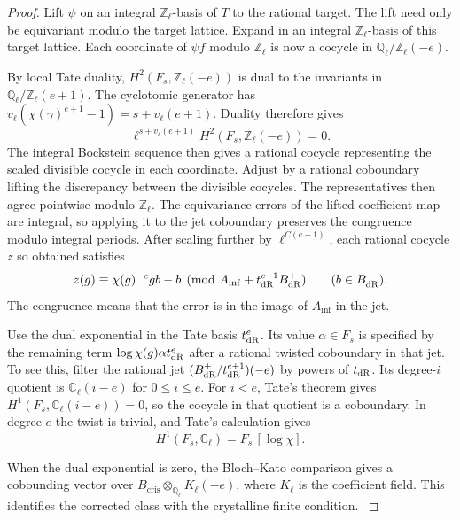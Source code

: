 \begin{proof}
Lift \(\psi\) on an integral
\(\mathbb Z_\ell\)-basis of \(T\) to the rational
target. The lift need only be equivariant modulo the
target lattice. Expand in an integral
\(\mathbb Z_\ell\)-basis of this target lattice.
Each coordinate of \(\psi f\) modulo \(\mathbb Z_\ell\)
is now a cocycle in
\(\mathbb Q_\ell/\mathbb Z_\ell(-e)\).

By local Tate duality,
\(H^2(F_s,\mathbb Z_\ell(-e))\) is dual to the
invariants in \(\mathbb Q_\ell/\mathbb Z_\ell(e+1)\).
The cyclotomic generator has \(v_\ell(\chi(\gamma)^{e+1}-1)=s+v_\ell(e+1)\). Duality therefore gives
\[
 \ell^{s+v_\ell(e+1)}H^2(F_s,\mathbb Z_\ell(-e))=0.
\]
The integral Bockstein sequence
then gives a rational cocycle representing the scaled
divisible cocycle in each coordinate. Adjust by a
rational coboundary lifting the discrepancy between
the divisible cocycles. The representatives then
agree pointwise modulo
\(\mathbb Z_\ell\).
The equivariance errors of the lifted coefficient
map are integral, so applying it to the jet
coboundary preserves the congruence modulo integral
periods. After scaling further by \(\ell^{C(e+1)}\),
each rational cocycle \(z\) so obtained satisfies
\[
 z(g)\equiv \chi(g)^{-e}g b-b
       \pmod {A_{\inf}+t_{\rm dR}^{e+1}B_{\rm dR}^+}
 \qquad (b\in B_{\rm dR}^+).
\]
The congruence means that the error is in the
image of \(A_{\inf}\) in the jet.

Use the dual exponential in the Tate basis \(t_{\rm dR}^e\). Its value \(\alpha\in F_s\) is
specified by the remaining term
\(\log\chi(g)\alpha t_{\rm dR}^e\) after a rational
twisted coboundary in that jet. To see this, filter the rational jet
\((B_{\rm dR}^+/t_{\rm dR}^{e+1})(-e)\) by powers of \(t_{\rm dR}\).
Its degree-\(i\) quotient is \(\mathbb C_\ell(i-e)\) for \(0\le i\le e\).
For \(i<e\), Tate's theorem gives
\(H^1(F_s,\mathbb C_\ell(i-e))=0\), so the cocycle in that quotient is
a coboundary. In degree \(e\) the twist is trivial, and Tate's calculation gives
\[
 H^1(F_s,\mathbb C_\ell)=F_s\,[\log\chi].
\]

When the dual exponential is zero, the Bloch--Kato
comparison gives a cobounding vector over
\(B_{\mathrm{cris}}\otimes_{\mathbb Q_\ell}K_\ell(-e)\),
where \(K_\ell\) is the coefficient field. This identifies
the corrected class with the crystalline finite condition.
\cite{tate-pdivisible,bloch-kato}\label{cor:cyclotomic-character-lifting-2}


\end{proof}
